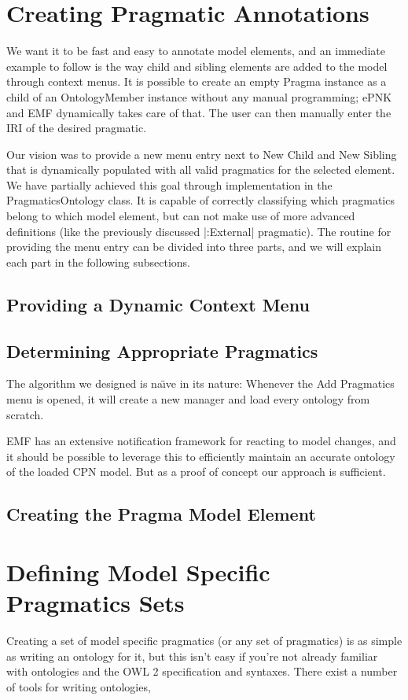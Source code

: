 \section{Creating Pragmatic Annotations}
We want it to be fast and easy to annotate model elements, and an immediate
example to follow is the way child and sibling elements are added to the model
through context menus. It is possible to create an empty Pragma instance as a
child of an OntologyMember instance without any manual programming; ePNK and EMF
dynamically takes care of that. The user can then manually enter the IRI of the
desired pragmatic.

Our vision was to provide a new menu entry next to New Child and New
Sibling that is dynamically populated with all valid pragmatics for the selected
element.
We have partially achieved this goal through implementation in the PragmaticsOntology
class. It is capable of correctly classifying which pragmatics belong to which
model element, but can not make use of more advanced definitions (like the
previously discussed |:External| pragmatic). The routine for providing the menu
entry can be divided into three parts, and we will explain each part in the
following subsections.

	\subsection{Providing a Dynamic Context Menu}
	
	
	\subsection{Determining Appropriate Pragmatics}
	
	The algorithm we designed is na\"{\i}ve in its nature: Whenever the Add
	Pragmatics menu is opened, it will create a new manager and load every ontology
	from scratch. 
	
	EMF has an extensive notification framework for reacting to model changes, and
	it should be possible to leverage this to efficiently maintain an accurate
	ontology of the loaded CPN model. But as a proof of concept our approach is
	sufficient.
	
	\subsection{Creating the Pragma Model Element}
	
\section{Defining Model Specific Pragmatics Sets}
Creating a set of model specific pragmatics (or any set of pragmatics) is as
simple as writing an ontology for it, but this isn't easy if you're not already
familiar with ontologies and the OWL 2 specification and syntaxes. There exist
a number of tools for writing ontologies, 

